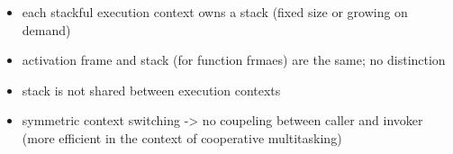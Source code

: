 \begin{itemize}
    \item   each stackful execution context owns a stack (fixed size or growing
            on demand)
    \item   activation frame and stack (for function frmaes) are the same; no
            distinction
    \item   stack is not shared between execution contexts
    \item   symmetric context switching -> no coupeling between caller and
            invoker (more efficient in the context of cooperative multitasking)
\end{itemize}
